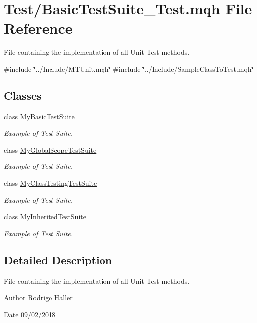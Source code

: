\hypertarget{_basic_test_suite___test_8mqh}{}\section{Test/\+Basic\+Test\+Suite\+\_\+\+Test.mqh File Reference}
\label{_basic_test_suite___test_8mqh}


File containing the implementation of all Unit Test methods.  


{\ttfamily \#include \char`\"{}../\+Include/\+M\+T\+Unit.\+mqh\char`\"{}}\newline
{\ttfamily \#include \char`\"{}../\+Include/\+Sample\+Class\+To\+Test.\+mqh\char`\"{}}\newline
\subsection*{Classes}
\begin{DoxyCompactItemize}
\item 
class \mbox{\hyperlink{class_my_basic_test_suite}{My\+Basic\+Test\+Suite}}
\begin{DoxyCompactList}\small\item\em Example of Test Suite. \end{DoxyCompactList}\item 
class \mbox{\hyperlink{class_my_global_scope_test_suite}{My\+Global\+Scope\+Test\+Suite}}
\begin{DoxyCompactList}\small\item\em Example of Test Suite. \end{DoxyCompactList}\item 
class \mbox{\hyperlink{class_my_class_testing_test_suite}{My\+Class\+Testing\+Test\+Suite}}
\begin{DoxyCompactList}\small\item\em Example of Test Suite. \end{DoxyCompactList}\item 
class \mbox{\hyperlink{class_my_inherited_test_suite}{My\+Inherited\+Test\+Suite}}
\begin{DoxyCompactList}\small\item\em Example of Test Suite. \end{DoxyCompactList}\end{DoxyCompactItemize}


\subsection{Detailed Description}
File containing the implementation of all Unit Test methods. 

\begin{DoxyAuthor}{Author}
Rodrigo Haller 
\end{DoxyAuthor}
\begin{DoxyDate}{Date}
09/02/2018 
\end{DoxyDate}
